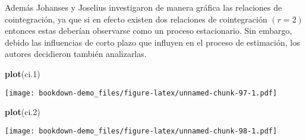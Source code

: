 \documentclass[]{book}
\newenvironment{Shaded}{\begin{snugshade}}{\end{snugshade}}
\newcommand{\KeywordTok}[1]{\textcolor[rgb]{0.13,0.29,0.53}{\textbf{#1}}}
\newcommand{\DataTypeTok}[1]{\textcolor[rgb]{0.13,0.29,0.53}{#1}}
\newcommand{\DecValTok}[1]{\textcolor[rgb]{0.00,0.00,0.81}{#1}}
\newcommand{\StringTok}[1]{\textcolor[rgb]{0.31,0.60,0.02}{#1}}
\newcommand{\OperatorTok}[1]{\textcolor[rgb]{0.81,0.36,0.00}{\textbf{#1}}}
\newcommand{\NormalTok}[1]{#1}
\theoremstyle{definition}
\theoremstyle{definition}
\theoremstyle{definition}
\theoremstyle{remark}
\begin{document}
Además Johanses y Joselius investigaron de manera gráfica las relaciones
de cointegración, ya que si en efecto existen dos relaciones de
cointegración \((r=2)\) entonces estas deberían observarse como un
proceso estacionario. Sin embargo, debido las influencias de corto plazo
que influyen en el proceso de estimación, los autores decidieron también
analizarlas.

\begin{Shaded}
\end{Shaded}

\begin{Shaded}
\begin{Highlighting}[]
\KeywordTok{plot}\NormalTok{(ci.}\DecValTok{1}\NormalTok{)}
\end{Highlighting}
\end{Shaded}

\texttt{[image: bookdown-demo\_files/figure-latex/unnamed-chunk-97-1.pdf]}

\begin{Shaded}
\begin{Highlighting}[]
\KeywordTok{plot}\NormalTok{(ci.}\DecValTok{2}\NormalTok{)}
\end{Highlighting}
\end{Shaded}

\texttt{[image: bookdown-demo\_files/figure-latex/unnamed-chunk-98-1.pdf]}
\end{document}
